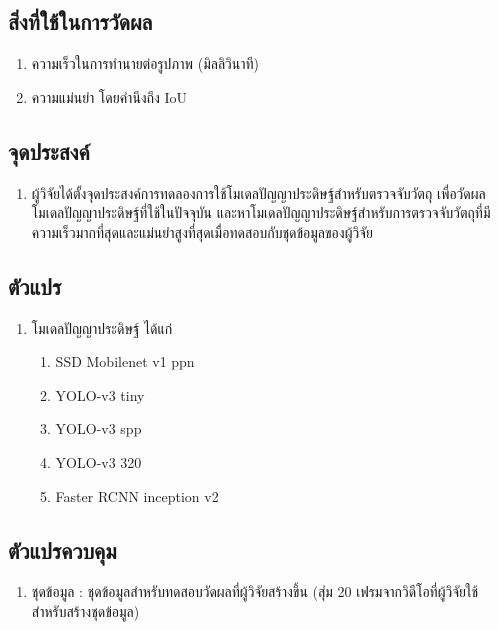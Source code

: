 \subsection*{สิ่งที่ใช้ในการวัดผล}
	\begin{enumerate}
		\setlength\itemsep{-0.25em}
		\item ความเร็วในการทำนายต่อรูปภาพ (มิลลิวินาที)
		\item ความแม่นยำ โดยคำนึงถึง IoU
	\end{enumerate}
\subsection*{จุดประสงค์}
	\begin{enumerate}
		\setlength\itemsep{-0.25em}
		\item ผู้วิจัยได้ตั้งจุดประสงค์การทดลองการใช้โมเดลปัญญาประดิษฐ์สำหรับตรวจจับวัตถุ เพื่อวัดผลโมเดลปัญญาประดิษฐ์ที่ใช้ในปัจจุบัน
และหาโมเดลปัญญาประดิษฐ์สำหรับการตรวจจับวัตถุที่มีความเร็วมากที่สุดและแม่นยำสูงที่สุดเมื่อทดสอบกับชุดข้อมูลของผู้วิจัย
	\end{enumerate}
\subsection*{ตัวแปร}
	\begin{enumerate}
		\setlength\itemsep{-0.25em}
		\item โมเดลปัญญาประดิษฐ์ ได้แก่
		\begin{enumerate}
			\setlength\itemsep{-0.25em}
			\item SSD Mobilenet v1 ppn
			\item YOLO-v3 tiny
			\item YOLO-v3 spp	
			\item YOLO-v3 320
			\item Faster RCNN inception v2
		\end{enumerate}
	\end{enumerate}
\subsection*{ตัวแปรควบคุม}
	\begin{enumerate}
		\setlength\itemsep{-0.25em}
		\item ชุดข้อมูล : ชุดข้อมูลสำหรับทดสอบวัดผลที่ผู้วิจัยสร้างขึ้น (สุ่ม 20 เฟรมจากวิดีโอที่ผู้วิจัยใช้สำหรับสร้างชุดข้อมูล)
	\end{enumerate}
